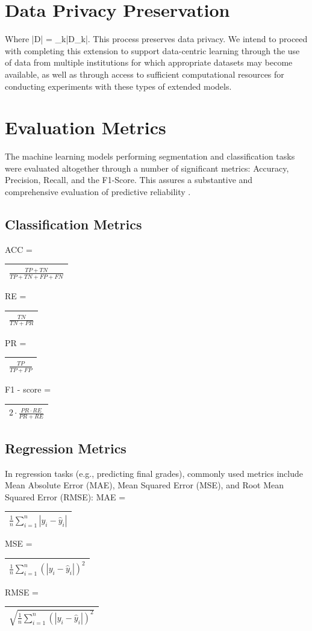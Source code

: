 \documentclass[twocolumn]{svjour3}
\begin{document}
\section{Data Privacy Preservation}
Where |D| = \sum_{k}|D_{k}|. This process preserves data privacy.
We intend to proceed with completing this extension to support data-centric learning through the use of data from multiple institutions for which appropriate datasets may become available, as well as through access to sufficient computational resources for conducting experiments with these types of extended models.
\section{Evaluation Metrics}
The machine learning models performing segmentation and classification tasks were evaluated altogether through a number of significant metrics: Accuracy, Precision, Recall, and the F1-Score. This assures a substantive and comprehensive evaluation of predictive reliability \cite{36}.
\subsection{Classification Metrics}
ACC =
\begin{tabular}{l}
$\frac{TP+TN}{TP+TN+FP+FN}$ \\
\hline
\end{tabular}
RE =
\begin{tabular}{l}
$\frac{TN}{TN+PR}$ \\
\hline
\end{tabular}
PR =
\begin{tabular}{l}
$\frac{TP}{TP+FP}$ \\
\hline
\end{tabular}
F1 - score =
\begin{tabular}{l}
$2 \cdot \frac{PR \cdot RE}{PR + RE}$ \\
\hline
\end{tabular}
\subsection{Regression Metrics}
In regression tasks (e.g., predicting final grades), commonly used metrics include Mean Absolute Error (MAE), Mean Squared Error (MSE), and Root Mean Squared Error (RMSE):
MAE =
\begin{tabular}{l}
$\frac{1}{n} \sum_{i=1}^{n} |y_{i} - \hat{y}_{i}|$ \\
\hline
\end{tabular}
MSE =
\begin{tabular}{l}
$\frac{1}{n} \sum_{i=1}^{n} (|y_{i} - \hat{y}_{i}|)^{2}$ \\
\hline
\end{tabular}
RMSE =
\begin{tabular}{l}
$\sqrt{\frac{1}{n} \sum_{i=1}^{n} (|y_{i} - \hat{y}_{i}|)^{2}}$ \\
\hline
\end{tabular}
\end{document}
